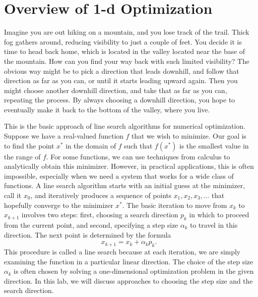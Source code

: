 \label{lab:1-dOpt}

\section*{Overview of 1-d Optimization}
Imagine you are out hiking on a mountain, and you lose track of the trail. Thick fog
gathers around, reducing visibility to just a couple of feet. You decide it is time
to head back home, which is located in the valley located near the base of the mountain.
How can you find your way back with such limited visibility? The obvious way might be to
pick a direction that leads downhill, and follow that direction as far as you can, or
until it starts leading upward again. Then you might choose another downhill direction,
and take that as far as you can, repeating the process. By always choosing a downhill
direction, you hope to eventually make it back to the bottom of the valley, where you live.

This is the basic approach of line search algorithms for numerical optimization.
Suppose we have a real-valued function $f$ that we wish to minimize. Our goal is to find the
point $x^*$ in the domain of $f$ such that $f(x^*)$ is the smallest value in the range of
$f$. For some functions, we can use techniques from calculus to analytically obtain this
minimizer. However, in practical applications, this is often impossible, especially when
we need a system that works for a wide class of functions. A line search algorithm starts with
an initial guess at the minimizer, call it $x_0$, and iteratively produces a sequence of
points $x_1, x_2, x_3, \ldots$ that hopefully converge to the minimizer $x^*$. The basic
iteration to move from $x_k$ to $x_{k+1}$ involves two steps: first, choosing a search direction $p_k$
in which to proceed from the current point, and second, specifying a step size $\alpha_k$ to travel
in this direction. The next point is determined by the formula
$$
x_{k+1} = x_k + \alpha_kp_k.
$$
This procedure is called a line search because at each iteration, we are simply examining the
function in a particular linear direction. The choice of the step size $\alpha_k$ is often
chosen by solving a one-dimensional optimization problem in the given direction. In this lab,
we will discuss approaches to choosing the step size and the search direction.

